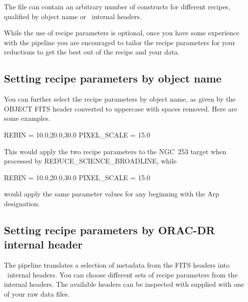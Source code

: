 \documentclass[11pt,oneside,chapters]{starlink}
\begin{document}
The  file can contain an arbitrary number of \param{[]}
constructs for different recipes, qualified by object name or
\ORACDR\ internal headers.

While the use of recipe parameters is optional, once you have some
experience with the pipeline you are encouraged to tailor the recipe
parameters for your reductions to get the best out of the recipe and
your data.

\subsection{Setting recipe parameters by object name}
\label{sec:recpars_object}

You can further select the recipe parameters by object name, as given
by the OBJECT FITS header converted to uppercase with spaces removed.
Here are some examples.

\vspace{0.2cm}
\begin{terminalv}
REBIN = 10.0,20.0,30.0
PIXEL_SCALE = 15.0
\end{terminalv}

This would apply the two recipe parameters to the NGC~253 target
when processed by REDUCE\_SCIENCE\_BROADLINE, while

\vspace{0.2cm}
\begin{terminalv}
REBIN = 10.0,20.0,30.0
PIXEL_SCALE = 15.0
\end{terminalv}

would apply the same parameter values for any beginning with the Arp
designation.

\subsection{Setting recipe parameters by ORAC-DR internal header}
\label{sec:recpars_orac}

The pipeline translates a selection of metadata from the FITS headers
into \oracdr\ internal headers.  You can choose different sets of recipe
parameters from the internal headers.  The available headers can be
inspected with  supplied with one of your raw data
files.

\vspace{0.2cm}
\begin{terminalv}
\end{terminalv}
\end{document}

